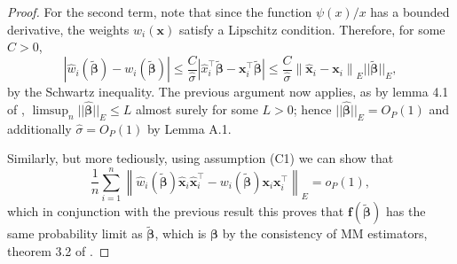 \documentclass[11pt]{article}
\begin{document}
\begin{proof}
For the second term, note that since the function $\psi(x)/x$ has a  bounded derivative, the weights $w_i(\mathbf{x})$ satisfy a Lipschitz condition. Therefore, for some $C>0$,
\begin{equation*}
\left| \widehat{w}_i ( \boldsymbol{\widetilde{\beta}}) - w_i ( \boldsymbol{\widetilde{\beta}}) \right| \leq \frac{C}{\widehat{\sigma}} \left| \widehat{x}_{i}^{\top}\boldsymbol{\widetilde{\beta}} -\mathbf{x}_i ^{\top} \boldsymbol{\widetilde{\beta}} \right| \leq \frac{C}{\widehat{\sigma}}  \left\| \mathbf{\widehat{x}}_i - \mathbf{x}_i \right\|_{E} || \boldsymbol{ \widetilde{\beta}} ||_{E},
\end{equation*}
by the Schwartz inequality. The previous argument now applies, as by lemma 4.1 of \citep{yohaitec}, $\limsup_{n} ||\boldsymbol{\widehat{\beta}} ||_{E} \leq L$ almost surely for some $L>0$; hence $||\boldsymbol{\widehat{\beta}} ||_{E} = O_{P}(1)$  and additionally $\widehat{\sigma} =  O_{P}(1)$ by Lemma A.1.

Similarly, but more tediously, using assumption (C1) we can show that 
\begin{equation*}
\frac{1}{n} \sum_{i=1}^n \left\| \widehat{w}_i ( \boldsymbol{\widetilde{\beta}} ) \mathbf{\widehat{x}}_i \mathbf{\widehat{x}}_i^{\top} - w_i ( \boldsymbol{\widetilde{\beta}} ) \mathbf{x}_i \mathbf{x}_i^{\top}  \right\|_{E} = o_{P}(1),
\end{equation*}
which in conjunction with the previous result this proves that $\mathbf{f} (\boldsymbol{\widetilde{\beta}})$ has the same probability limit as $\boldsymbol{\widetilde{\beta}}$, which is $\boldsymbol{\beta}$ by the consistency of MM estimators, theorem 3.2 of \citep{yohai1987high}.


\end{proof}
\end{document}
